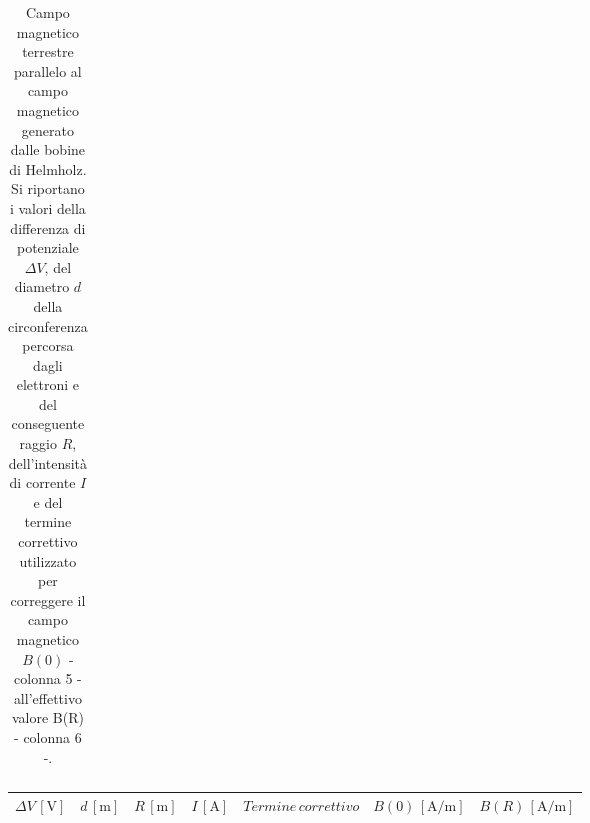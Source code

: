 \documentclass[]{article}
\begin{document}
\begin{table}
\begin{tabular}{||c|c|c|c|c|c|c||}
\end{tabular}
    \caption{Campo magnetico terrestre parallelo al campo magnetico generato dalle bobine di Helmholz. Si riportano i valori della differenza di potenziale $\Delta V$, del diametro $ d $ della circonferenza percorsa dagli elettroni e del conseguente raggio $ R $, dell'intensità di corrente $ I $ e del termine correttivo utilizzato per correggere il campo magnetico $B(0)$ - colonna 5 - all'effettivo valore B(R) - colonna 6 -.}
    \label{CM_parallelo}
\end{table}


\begin{table}
    \centering

\begin{tabular}{||c|c|c|c|c|c|c||}
    \hline
    $\Delta V\, [\text{V}] $ & $d\, [\text{m}] $ & $R\, [\text{m}] $ & $I\, [\text{A}] $ & $Termine \, correttivo $ & $B(0)\, [\text{A/m}] $ & $B(R)\, [\text{A/m}] $\\
    \hline\hline




\end{tabular}
\end{table}
\end{document}
